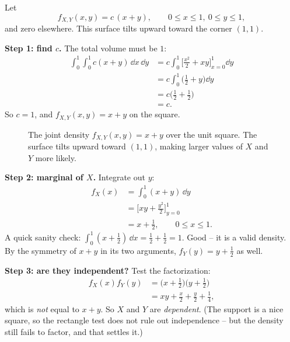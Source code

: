 \begin{example}
\label{ch13:ex-coupled}
Let
\[
  f_{X,Y}(x,y) = c\,(x + y), \qquad 0\le x\le 1,\ 0\le y\le 1,
\]
and zero elsewhere. This surface tilts upward toward the corner $(1,1)$.

\textbf{Step 1: find $c$.} The total volume must be $1$:
\begin{align*}
  \int_0^1\!\!\int_0^1 c(x+y)\,\dd x\,\dd y
  &= c\int_0^1\!\Big[\tfrac{x^2}{2} + xy\Big]_{x=0}^{1}\dd y \\
  &= c\int_0^1\!\Big(\tfrac12 + y\Big)\dd y \\
  &= c\Big(\tfrac12+\tfrac12\Big) \\
  &= c.
\end{align*}
So $c = 1$, and $f_{X,Y}(x,y) = x+y$ on the square.

\begin{figure}[H]
\centering
{}
\caption{The joint density $f_{X,Y}(x,y) = x+y$ over the unit square. The surface tilts upward toward $(1,1)$, making larger values of $X$ and $Y$ more likely.}
\label{ch13:fig-surface-xy}
\end{figure}

\textbf{Step 2: marginal of $X$.} Integrate out $y$:
\begin{align*}
  f_X(x) &= \int_0^1 (x+y)\,\dd y \\
         &= \Big[xy + \tfrac{y^2}{2}\Big]_{y=0}^{1} \\
         &= x + \tfrac12, \qquad 0\le x\le 1.
\end{align*}
A quick sanity check: $\int_0^1 (x+\tfrac12)\,\dd x = \tfrac12+\tfrac12 = 1$.
Good -- it is a valid density. By the symmetry of $x+y$ in its two arguments,
$f_Y(y) = y + \tfrac12$ as well.

\textbf{Step 3: are they independent?} Test the factorization:
\begin{align*}
  f_X(x)f_Y(y) &= \big(x+\tfrac12\big)\big(y+\tfrac12\big) \\
  &= xy + \tfrac{x}{2} + \tfrac{y}{2} + \tfrac14,
\end{align*}
which is \emph{not} equal to $x+y$. So $X$ and $Y$ are \emph{dependent}. (The
support is a nice square, so the rectangle test does not rule out independence --
but the density still fails to factor, and that settles it.)


\end{example}
